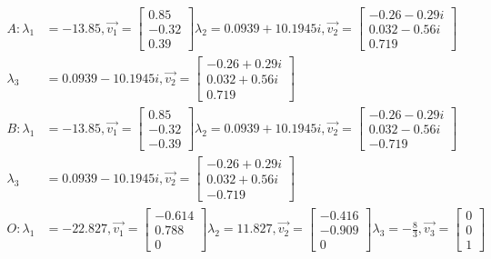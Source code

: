 \documentclass[12pt, a4paper]{article}
\theoremstyle{definition}
\begin{document}
\begin{align*}
    A: \lambda_1 &= -13.85, \Vec{v_1} = \left[ \begin{array}{cc}0.85 \\ -0.32 \\ 0.39\end{array} \right] \lambda_2 = 0.0939 + 10.1945i, \Vec{v_2} = \left[ \begin{array}{c} -0.26-0.29i \\ 0.032-0.56i \\ 0.719 \end{array} \right]\\
    \lambda_3 &= 0.0939 - 10.1945i, \Vec{v_2} = \left[ \begin{array}{c} -0.26+0.29i \\ 0.032+0.56i \\ 0.719 \end{array} \right]\\
    B: \lambda_1 &= -13.85, \Vec{v_1} = \left[ \begin{array}{cc}0.85 \\ -0.32 \\ -0.39\end{array} \right] \lambda_2 = 0.0939 + 10.1945i, \Vec{v_2} = \left[ \begin{array}{c} -0.26-0.29i \\ 0.032-0.56i \\ -0.719 \end{array} \right]\\
    \lambda_3 &= 0.0939 - 10.1945i, \Vec{v_2} = \left[ \begin{array}{c} -0.26+0.29i \\ 0.032+0.56i \\ -0.719 \end{array} \right]\\
    O: \lambda_1 &= -22.827, \Vec{v_1} = \left[\begin{array}{c} -0.614\\  0.788\\ 0\end{array} \right] \lambda_2 = 11.827, \Vec{v_2} = \left[ \begin{array}{c} -0.416\\-0.909\\0\end{array}\right]
    \lambda_3 = -\frac{8}{3}, \Vec{v_3} = \left[ \begin{array}{c}0\\0\\1\end{array} \right]
\end{align*}
\end{document}
